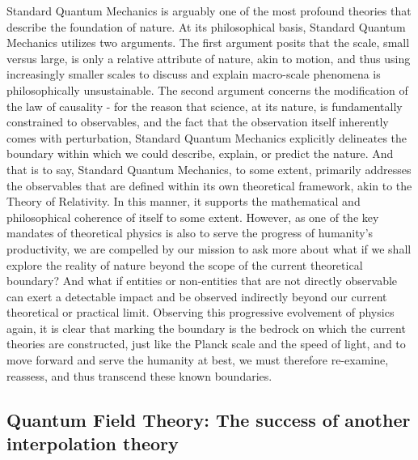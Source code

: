 \documentclass{article}
\begin{document}
Standard Quantum Mechanics is arguably one of the most profound theories that describe the foundation of nature. At its philosophical basis, Standard Quantum Mechanics utilizes two arguments. \cite{Dirac2024} The first argument posits that the scale, small versus large, is only a relative attribute of nature, akin to motion, and thus using increasingly smaller scales to discuss and explain macro-scale phenomena is philosophically unsustainable. The second argument concerns the modification of the law of causality - for the reason that science, at its nature, is fundamentally constrained to observables, and the fact that the observation itself inherently comes with perturbation, Standard Quantum Mechanics explicitly delineates the boundary within which we could describe, explain, or predict the nature. And that is to say, Standard Quantum Mechanics, to some extent, primarily addresses the observables that are defined within its own theoretical framework, akin to the Theory of Relativity. \cite{maudlin2025} In this manner, it supports the mathematical and philosophical coherence of itself to some extent. \cite{LandauLifshitzV3_2008} However, as one of the key mandates of theoretical physics is also to serve the progress of humanity's productivity, we are compelled by our mission to ask more about what if we shall explore the reality of nature beyond the scope of the current theoretical boundary? And what if entities or non-entities that are not directly observable can exert a detectable impact and be observed indirectly beyond our current theoretical or practical limit. Observing this progressive evolvement of physics again, it is clear that marking the boundary is the bedrock on which the current theories are constructed, just like the Planck scale and the speed of light, and to move forward and serve the humanity at best, we must therefore re-examine, reassess, and thus transcend these known boundaries.

\subsection{Quantum Field Theory: The success of another interpolation theory}
\end{document}
